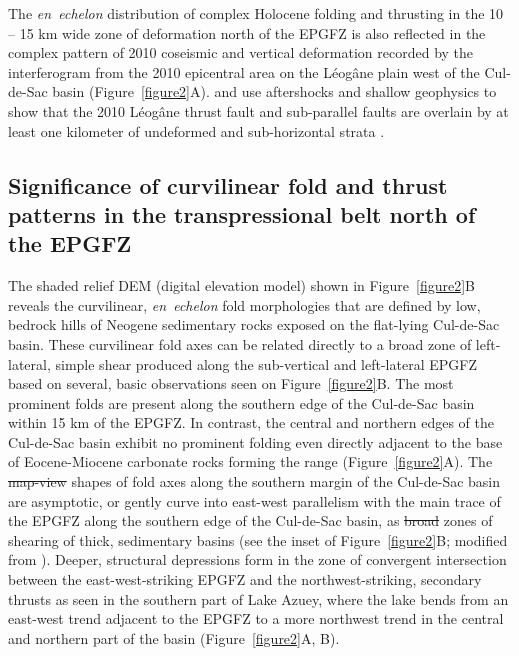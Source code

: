 \documentclass[linenumbers,draft]{agujournal}
\providecommand{\DIFaddtex}[1]{{\protect\color{blue}\uwave{#1}}} %
\providecommand{\DIFdeltex}[1]{{\protect\color{red}\sout{#1}}}                      %
\providecommand{\DIFaddbegin}{} %
\providecommand{\DIFaddend}{} %
\providecommand{\DIFdelbegin}{} %
\providecommand{\DIFdelend}{} %
\providecommand{\DIFadd}[1]{\texorpdfstring{\DIFaddtex{#1}}{#1}} %
\providecommand{\DIFdel}[1]{\texorpdfstring{\DIFdeltex{#1}}{}} %
\begin{document}
The \textit{en~echelon} distribution of complex Holocene folding and thrusting in the 10 -- 15 km wide zone of deformation north of the EPGFZ is also reflected in the complex pattern of 2010 coseismic and vertical deformation recorded by the interferogram from the 2010 epicentral area on the L\'eog\^ane plain west of the Cul-de-Sac basin \citep{hayes2010complex,hashimoto2011fan,bilham2013remote} (Figure~\ref{figure2}A). \citet{douilly2013crustal,douilly2015three} and \citet{kocel2016near} use aftershocks and shallow geophysics to show that the 2010 L\'eog\^ane thrust fault and sub-parallel faults are overlain by at least one kilometer of undeformed and sub-horizontal strata \DIFaddbegin \DIFadd{(cross-section A--A' in Figure~\ref{figure3})}\DIFaddend .

\subsection{Significance of curvilinear fold and thrust patterns in the transpressional belt north of the EPGFZ}
The shaded relief DEM (digital elevation model) shown in Figure~\ref{figure2}B reveals the curvilinear, \textit{en~echelon} fold morphologies that are defined by low, bedrock hills of Neogene sedimentary rocks exposed on the flat-lying Cul-de-Sac basin. These curvilinear fold axes can be related directly to a broad zone of left-lateral, simple shear produced along the sub-vertical and left-lateral EPGFZ based on several, basic observations seen on Figure~\ref{figure2}B. The most prominent folds are present along the southern edge of the Cul-de-Sac basin within 15 km of the EPGFZ. In contrast, the central and northern edges of the Cul-de-Sac basin exhibit no prominent folding even directly adjacent to the base of Eocene-Miocene carbonate rocks forming the range \citep{pubellier2000plate} (Figure~\ref{figure2}A). The \DIFdelbegin \DIFdel{map-view }\DIFdelend \DIFaddbegin \DIFadd{mapview }\DIFaddend shapes of fold axes along the southern margin of the Cul-de-Sac basin are asymptotic, or gently curve into east-west parallelism with the main trace of the EPGFZ along the southern edge of the Cul-de-Sac basin, as \DIFdelbegin \DIFdel{broad }\DIFdelend \DIFaddbegin \DIFadd{wide and diffuse }\DIFaddend zones of shearing of thick, sedimentary basins (see the inset of Figure~{\ref{figure2}}B; modified from \citet{odonne1983analogue}). Deeper, structural depressions form in the zone of convergent intersection between the east-west-striking EPGFZ and the northwest-striking, secondary thrusts as seen in the southern part of Lake Azuey, where the lake bends from an east-west trend adjacent to the EPGFZ to a more northwest trend in the central and northern part of the basin (Figure~\ref{figure2}A, B).
\end{document}

